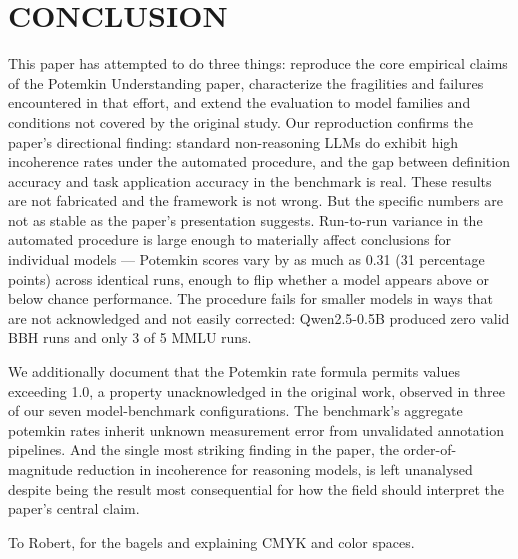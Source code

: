 \documentclass[sigconf,authordraft]{acmart}
\begin{document}
\section{CONCLUSION}
This paper has attempted to do three things: reproduce the core empirical claims of the Potemkin Understanding paper, characterize the fragilities and failures encountered in that effort, and extend the evaluation to model families and conditions not covered by the original study.
Our reproduction confirms the paper's directional finding: standard non-reasoning LLMs do exhibit high incoherence rates under the automated procedure, and the gap between definition accuracy and task application accuracy in the benchmark is real. These results are not fabricated and the framework is not wrong.
But the specific numbers are not as stable as the paper's presentation suggests. Run-to-run variance in the automated procedure is large enough to materially affect conclusions for individual models --- Potemkin scores vary by as much as 0.31 (31 percentage points) across identical runs, enough to flip whether a model appears above or below chance performance. The procedure fails for smaller models in ways that are not acknowledged and not easily corrected: Qwen2.5-0.5B produced zero valid BBH runs and only 3 of 5 MMLU runs.

We additionally document that the Potemkin rate formula permits values exceeding 1.0, a property unacknowledged in the original work, observed in three of our seven model-benchmark configurations. The benchmark's aggregate potemkin rates inherit unknown measurement error from unvalidated annotation pipelines. And the single most striking finding in the paper, the order-of-magnitude reduction in incoherence for reasoning models, is left unanalysed despite being the result most consequential for how the field should interpret the paper's central claim.


\begin{acks}
To Robert, for the bagels and explaining CMYK and color spaces.
\end{acks}



%
\end{document}
